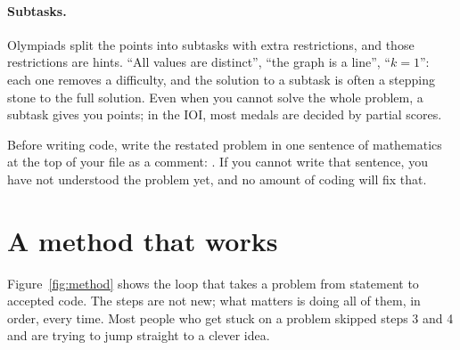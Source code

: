 \paragraph{Subtasks.} Olympiads split the points into subtasks with extra restrictions, and those restrictions are hints.
``All values are distinct'', ``the graph is a line'', ``$k = 1$'': each one removes a difficulty, and the solution to a
subtask is often a stepping stone to the full solution. Even when you cannot solve the whole problem, a subtask gives you
points; in the IOI, most medals are decided by partial scores.

\begin{tip}
Before writing code, write the restated problem in one sentence of mathematics at the top of your file as a comment:
. If you cannot write that sentence, you have not
understood the problem yet, and no amount of coding will fix that.
\end{tip}

\section[A method that works]{A method that works \hfill \bronze}\label{sec:method}

Figure~\ref{fig:method} shows the loop that takes a problem from statement to accepted code. The steps are not new; what
matters is doing all of them, in order, every time. Most people who get stuck on a problem skipped steps 3 and 4 and are
trying to jump straight to a clever idea.

